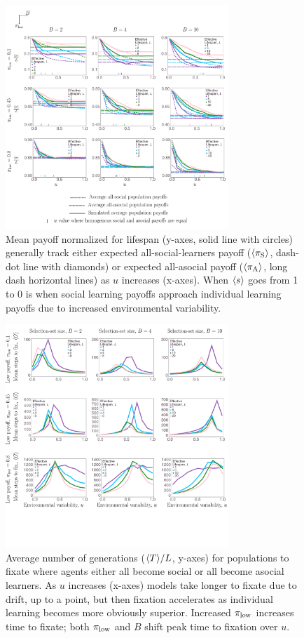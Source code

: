\documentclass[letterpaper,11.5pt]{scrartcl}
\begin{document}
\begin{figure}
  \caption{Mean payoff normalized for lifespan (y-axes, solid line with circles)
    generally track either expected all-social-learners payoff ($\langle \pi_\mathrm{S} \rangle$, dash-dot
    line with diamonds) or expected all-asocial payoff ($\langle \pi_\mathrm{A} \rangle$, long dash
    horizontal lines) as $u$ increases (x-axes). When $\langle s \rangle$ goes from 1 to
  0 is when social learning payoffs approach individual learning payoffs due to
increased environmental variability.} 
  \label{fig:netPayoffs}
\centering
    \includegraphics[width=0.75\textwidth]{Figures/meanNetPayoffs.pdf}
\end{figure}


\begin{figure}
  \caption{Average number of generations ($\langle T \rangle/L$, y-axes) for populations to fixate
  where agents either all become social or all become asocial learners. As
  $u$ increases (x-axes) models take longer to fixate due to drift, up to a point,
but then fixation accelerates as individual learning becomes more obviously 
superior. Increased $\pi_{\mathrm{low}}$ increases time to fixate; both $\pi_{\mathrm{low}}$ and $B$
shift peak time to fixation over $u$.} 
  \label{fig:steps}
\centering
    \includegraphics[width=0.75\textwidth]{Figures/stepResultsPlots.pdf}
\end{figure}
\end{document}
